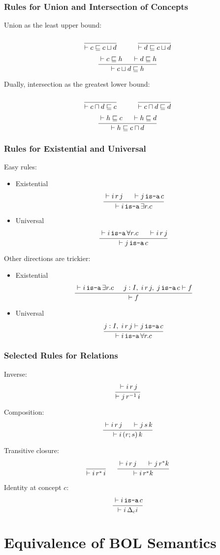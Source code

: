 \begin{frame}\frametitle{Rules for Union and Intersection of Concepts}
Union as the least upper bound:
\[\rul{}{\vdash c\sqsubseteq c\sqcup d} \tb\tb \rul{}{\vdash d\sqsubseteq c\sqcup d }\]
\[\cfrac{\vdash c\sqsubseteq h \hspace*{.5cm} \vdash d\sqsubseteq h}{\vdash c\sqcup d \sqsubseteq h}\,\]
\medskip

Dually, intersection as the greatest lower bound:
\[\rul{}{\vdash c\sqcap d\sqsubseteq c} \tb\tb \rul{}{\vdash c\sqcap d\sqsubseteq d}\]
\[\cfrac{\vdash h\sqsubseteq c \hspace*{.5cm} \vdash h\sqsubseteq d}{\vdash h \sqsubseteq c\sqcap d}\,\]
\end{frame}

\begin{frame}\frametitle{Rules for Existential and Universal}
Easy rules:
\begin{itemize}
\item Existential
\[\cfrac{\vdash i\,r\,j \hspace*{.5cm} \vdash j\mathop{\texttt{is-a}} c}{\vdash i \mathop{\texttt{is-a}} \exists r.c }\,\]
\item Universal
\[\cfrac{\vdash i \mathop{\texttt{is-a}} \forall r.c \hspace*{.5cm} \vdash i\,r\,j}{\vdash j\mathop{\texttt{is-a}} c}\,\]
\end{itemize}

Other directions are trickier:

\begin{itemize}
\item Existential
\[\cfrac{\vdash i \mathop{\texttt{is-a}} \exists r.c \hspace*{.5cm} j:I,\;i\,r\,j,\;j\mathop{\texttt{is-a}} c\vdash f}{\vdash f}\,\]
\item Universal
\[\cfrac{j:I,\; i\,r\,j\vdash j\mathop{\texttt{is-a}} c}{\vdash i\mathop{\texttt{is-a}}\forall r.c}\,\]
\end{itemize}
\end{frame}

\begin{frame}\frametitle{Selected Rules for Relations}
Inverse:
\[\cfrac{\vdash i \,r\,j}{\vdash j\,r^{-1}\,i}\,\]

Composition:
\[\cfrac{\vdash i \,r\,j \hspace*{.5cm} \vdash j\,s\,k}{\vdash i\,(r;s)\,k}\,\]

Transitive closure:
\[\cfrac{}{\vdash i \,r^*\,i}\, \hspace*{.5cm} \cfrac{\vdash i\,r\,j \hspace*{.5cm} \vdash j\,r^* k}{\vdash i\,r^* k}\,\]

Identity at concept $c$:
\[\cfrac{\vdash i \mathop{\texttt{is-a}} c}{\vdash i\,\Delta_c i}\,\]
\end{frame}

\section{Equivalence of BOL Semantics}

